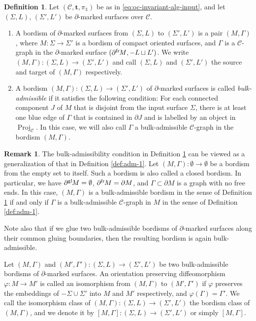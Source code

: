 \documentclass[11pt]{amsart}
\theoremstyle{definition}
\newtheorem{definition}[thm]{Definition}
\newtheorem{remark}[thm]{Remark}
\numberwithin{equation}{section}
\def\bd{{\partial}}
\def\mtr{{\mathbf{t}}} %
\newcommand{\Proj}{\operatorname{Proj}}
\newcommand{\bdf}[1]{{\bd^{\operatorname{fr}}\hspace{-1pt}{#1}}}
\newcommand{\bdg}[1]{{\bd^{\operatorname{gl}}\hspace{-1pt}{#1}}}
\def\vphi{\varphi}
\def\cC{\mathcal{C}}
\def\1{{\mathds{1}}}
\def\to{\rightarrow}
\begin{document}
\begin{definition}\label{def:adm-cob}
Let $(\cC, \mtr, \pi_\1)$ be as in \eqref{eq:oc-invariant-alg-input}, and let $(\Sigma, L)$, $(\Sigma',L')$ be $\bd$-marked surfaces over $\cC$. 
\begin{enumerate}
\item 
A bordism of $\bd$-marked surfaces from $(\Sigma, L)$ to $(\Sigma',L')$ is a pair $(M,\Gamma)$, where $M:\Sigma \to \Sigma'$ is a bordism of compact oriented surfaces, and $\Gamma$ is a $\cC$-graph
in the $\bd$-marked surface $(\bdf M, -L \sqcup L')$. 
We write $(M,\Gamma): (\Sigma, L) \to (\Sigma',L')$ and call $(\Sigma, L)$ and $(\Sigma',L')$ the source and target of $(M,\Gamma)$ respectively. 

\item
A bordism $(M,\Gamma): (\Sigma, L) \to (\Sigma',L')$ of $\bd$-marked surfaces is called \emph{bulk-admissible} if it satisfies the following condition: 
For each connected component $J$ of $M$ that is disjoint from the input surface $\Sigma$, there is at least one blue edge of $\Gamma$ that is contained in $\bd{J}$ and is labelled by an object in $\Proj_\cC$.
In this case, we will also call $\Gamma$ a bulk-admissible $\cC$-graph in the bordism $(M,\Gamma)$. 
\end{enumerate}
\end{definition}

\begin{remark}\label{rmk:adm}
The bulk-admissibility condition in Definition \ref{def:adm-cob} can be viewed as a generalization of that in Definition \ref{def:adm-1}. Let $(M,\Gamma): \emptyset \to \emptyset$ be a bordism from the empty set to itself. Such a bordism is also called a closed bordism. In particular, we have $\bdg M = \emptyset$, $\bdf M = \bd M$, and $\Gamma\subset\bd M$ is a graph with no free ends. In this case, $(M,\Gamma)$ is a bulk-admissible bordism in the sense of Definition \ref{def:adm-cob} if and only if $\Gamma$ is a bulk-admissible $\cC$-graph in $M$ in the sense of Definition \ref{def:adm-1}. 

Note also that if we glue two bulk-admissible bordisms of $\bd$-marked surfaces along their common gluing boundaries, then the resulting bordism is again bulk-admissible.
\end{remark}



Let $(M,\Gamma)$ and $(M',\Gamma'):(\Sigma, L) \to (\Sigma', L')$ be two bulk-admissible bordisms of $\bd$-marked surfaces. An orientation preserving diffeomorphism $\varphi: M \to M'$ is called an isomorphism from $(M,\Gamma)$ to $(M',\Gamma')$ if $\varphi$ preserves the embeddings of $-\Sigma \cup\Sigma'$ into $M$ and $M'$ respectively, and $\vphi(\Gamma) = \Gamma'$. We call the isomorphism class of $(M,\Gamma): (\Sigma, L) \to (\Sigma', L')$ the bordism class of $(M,\Gamma)$, and we denote it by $[M,\Gamma]: (\Sigma, L) \to (\Sigma', L')$ or simply $[M,\Gamma]$.
\end{document}
